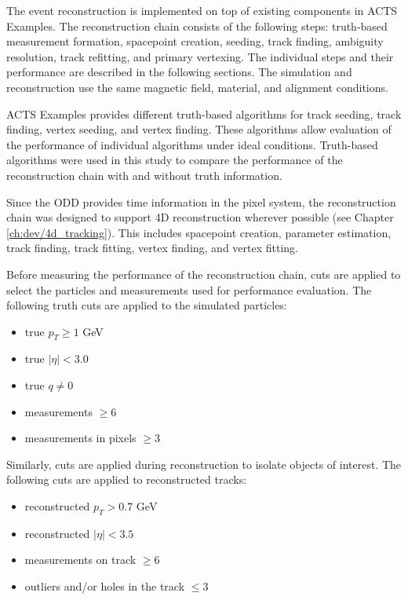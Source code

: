 The event reconstruction is implemented on top of existing components in ACTS Examples. The reconstruction chain consists of the following steps: truth-based measurement formation, spacepoint creation, seeding, track finding, ambiguity resolution, track refitting, and primary vertexing. The individual steps and their performance are described in the following sections. The simulation and reconstruction use the same magnetic field, material, and alignment conditions.

ACTS Examples provides different truth-based algorithms for track seeding, track finding, vertex seeding, and vertex finding. These algorithms allow evaluation of the performance of individual algorithms under ideal conditions. Truth-based algorithms were used in this study to compare the performance of the reconstruction chain with and without truth information.

Since the ODD provides time information in the pixel system, the reconstruction chain was designed to support 4D reconstruction wherever possible (see Chapter \ref{ch:dev/4d_tracking}). This includes spacepoint creation, parameter estimation, track finding, track fitting, vertex finding, and vertex fitting.

Before measuring the performance of the reconstruction chain, cuts are applied to select the particles and measurements used for performance evaluation. The following truth cuts are applied to the simulated particles:

\begin{itemize}
    \item true $p_T \ge 1$ GeV
    \item true $|\eta| < 3.0$
    \item true $q \ne 0$
    \item measurements $\ge 6$
    \item measurements in pixels $\ge 3$
\end{itemize}

Similarly, cuts are applied during reconstruction to isolate objects of interest. The following cuts are applied to reconstructed tracks:

\begin{itemize}
    \item reconstructed $p_T > 0.7$ GeV
    \item reconstructed $|\eta| < 3.5$
    \item measurements on track $\ge 6$
    \item outliers and/or holes in the track $\le 3$
\end{itemize}

